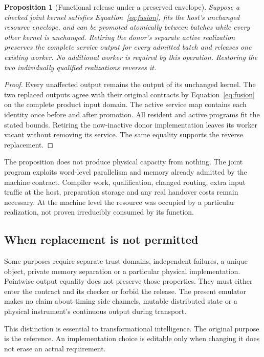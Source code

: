 \documentclass[11pt,letterpaper]{article}
\newtheorem{proposition}[theorem]{Proposition}
\theoremstyle{definition}\newtheorem{definition}[theorem]{Definition}
\theoremstyle{remark}\newtheorem{remark}[theorem]{Remark}
\begin{document}
\begin{proposition}[Functional release under a preserved envelope]
\label{prop:release}
Suppose a checked joint kernel satisfies Equation~\eqref{eq:fusion}, fits the host's unchanged resource envelope, and can be promoted atomically between batches while every other kernel is unchanged. Retiring the donor's separate active realization preserves the complete service output for every admitted batch and releases one existing worker. No additional worker is required by this operation. Restoring the two individually qualified realizations reverses it.
\end{proposition}
\begin{proof}
Every unaffected output remains the output of its unchanged kernel. The two replaced outputs agree with their original contracts by Equation~\eqref{eq:fusion} on the complete product input domain. The active service map contains each identity once before and after promotion. All resident and active programs fit the stated bounds. Retiring the now-inactive donor implementation leaves its worker vacant without removing its service. The same equality supports the reverse replacement.
\end{proof}

The proposition does not produce physical capacity from nothing. The joint program exploits word-level parallelism and memory already admitted by the machine contract. Compiler work, qualification, changed routing, extra input traffic at the host, preparation storage and any real handover costs remain necessary. At the machine level the resource was occupied by a particular realization, not proven irreducibly consumed by its function.

\subsection{When replacement is not permitted}
Some purposes require separate trust domains, independent failures, a unique object, private memory separation or a particular physical implementation. Pointwise output equality does not preserve those properties. They must either enter the contract and its checker or forbid the release. The present emulator makes no claim about timing side channels, mutable distributed state or a physical instrument's continuous output during transport.

This distinction is essential to transformational intelligence. The original purpose is the reference. An implementation choice is editable only when changing it does not erase an actual requirement.
\end{document}
